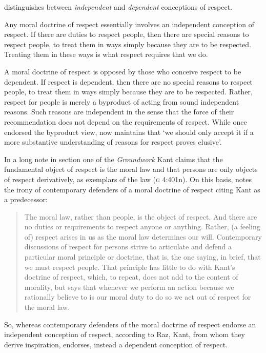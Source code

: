\documentclass[12pt]{article}
\begin{document}
\citet{Raz:2001ps,Raz:2002vn} distinguishes between \emph{independent} and \emph{dependent} conceptions of respect. 

Any moral doctrine of respect essentially involves an independent conception of respect. If there are duties to respect people, then there are special reasons to respect people, to treat them in ways simply because they are to be respected. Treating them in these ways is what respect requires that we do. 

A moral doctrine of respect is opposed by those who conceive respect to be dependent. If respect is dependent, then there are no special reasons to respect people, to treat them in ways simply because they are to be respected. Rather, respect for people is merely a byproduct of acting from sound independent reasons. Such reasons are independent in the sense that the force of their recommendation does not depend on the requirements of respect. While \citet{Raz:1986lq} once endorsed the byproduct view, \citet[127]{Raz:2001ps} now maintains that `we should only accept it if a more substantive understanding of reasons for respect proves elusive'. 

In a long note in section one of the \emph{Groundwork} Kant claims that the fundamental object of respect is the moral law and that persons are only objects of respect derivatively, as exemplars of the law (\textsc{g} 4:401n). On this basis, \citet[131]{Raz:2001ps} notes the irony of contemporary defenders of a moral doctrine of respect citing Kant as a predecessor:
\begin{quote}
	The moral law, rather than people, is the object of respect. And there are no duties or requirements to respect anyone or anything. Rather, (a feeling of) respect arises in us as the moral law determines our will. Contemporary discussions of respect for persons strive to articulate and defend a particular moral principle or doctrine, that is, the one saying, in brief, that we must respect people. That principle has little to do with Kant's doctrine of respect, which, to repeat, does not add to the content of morality, but says that whenever we perform an action because we rationally believe to is our moral duty to do so we act out of respect for the moral law. \citep[134]{Raz:2001ps}
\end{quote}
So, whereas contemporary defenders of the moral doctrine of respect endorse an independent conception of respect, according to Raz, Kant, from whom they derive inspiration, endorses, instead a dependent conception of respect.
\end{document}

